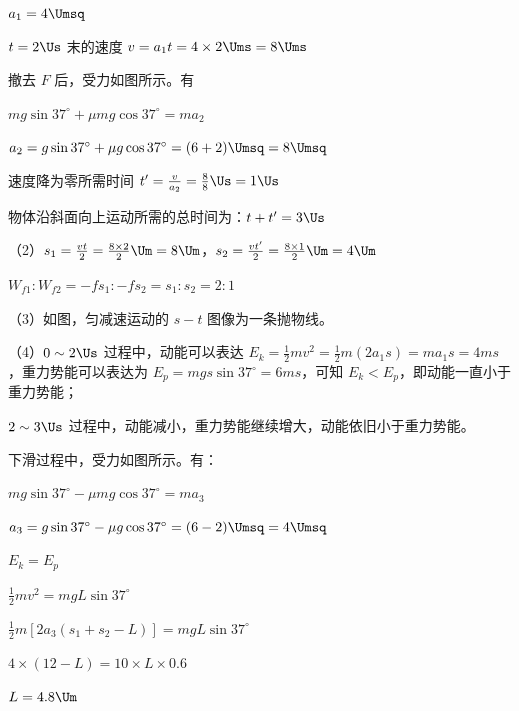 \documentclass[\gkver]{gaokaozhenti}
\begin{document}
\begin{enumerate}
{$a_{1} = 4\Umsq$

$t = 2\Us$ 末的速度 $v = a_{1}t = 4 \times 2\Ums = 8\Ums$

\onepicture[align=right, w=1.44cm]{}

撤去 $F$ 后，受力如图所示。有

$mg\sin 37^{\circ} + \mu mg\cos 37^{\circ} = ma_{2}$

$a_{2} = g\sin 37^{\circ} + \mu g\cos 37^{\circ} = (6 + 2)\Umsq = 8\Umsq$

速度降为零所需时间 $t' = \frac{v}{a_{2}} = \frac{8}{8}\Us = 1\Us$

物体沿斜面向上运动所需的总时间为：$t + t' = 3\Us$

（2）$s_{1} = \frac{vt}{2} = \frac{8 \times 2}{2}\Um = 8\Um$，$s_{2} = \frac{vt'}{2} = \frac{8 \times 1}{2}\Um = 4\Um$

$W_{f1}:W_{f2} = -fs_{1}:-fs_{2} = s_{1}:s_{2} = 2:1$

（3）如图，匀减速运动的 $s-t$ 图像为一条抛物线。

\onepicture[w=3.64cm]{}

（4）$0 \sim 2\Us$ 过程中，动能可以表达 $E_{k} = \frac{1}{2}mv^{2} = \frac{1}{2}m(2a_{1}s) = ma_{1}s = 4ms$，重力势能可以表达为 $E_{p} = mgs\sin 37^{\circ} = 6ms$，可知 $E_{k} < E_{p}$，即动能一直小于重力势能；

$2 \sim 3\Us$ 过程中，动能减小，重力势能继续增大，动能依旧小于重力势能。

\onepicture[align=right, w=1.71cm]{}

下滑过程中，受力如图所示。有：

$mg\sin 37^{\circ} - \mu mg\cos 37^{\circ} = ma_{3}$

$a_{3} = g\sin 37^{\circ} - \mu g\cos 37^{\circ} = (6 - 2)\Umsq = 4\Umsq$

$E_{k} = E_{p}$

$\frac{1}{2}mv^{2} = mgL\sin 37^{\circ}$

$\frac{1}{2}m\left[2a_{3}(s_{1} + s_{2} - L)\right] = mgL\sin 37^{\circ}$

$4 \times (12 - L) = 10 \times L \times 0.6$

$L = 4.8\Um$
}

\end{enumerate}
\end{document}
